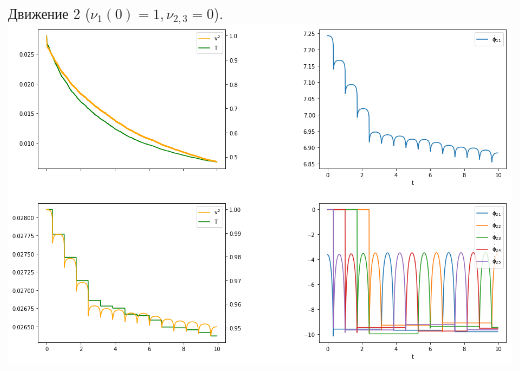 \begin{frame}{Движение 2 ($\nu_1(0) = 1, \nu_{2,3} = 0$).}
    \centering
    \includegraphics[width=\linewidth]{content/pic/new/impact_2.png}
    
\end{frame}

